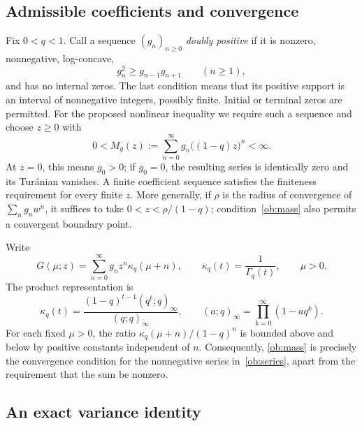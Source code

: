 \documentclass[11pt,a4paper]{article}
\theoremstyle{definition}
\theoremstyle{remark}
\begin{document}
\subsection{Admissible coefficients and convergence}
\label{ob:admissible}

Fix \(0<q<1\). Call a sequence
\((g_n)_{n\ge0}\) \emph{doubly positive} if it is nonzero,
nonnegative, log-concave,
\[
 g_n^2\ge g_{n-1}g_{n+1}\qquad(n\ge1),
\]
and has no internal zeros. The last condition means that its positive
support is an interval of nonnegative integers, possibly finite. Initial or terminal
zeros are permitted. For the proposed nonlinear inequality we require
such a sequence and choose \(z\ge0\) with
\begin{equation}\label{ob:mass}
 0<M_g(z):=\sum_{n=0}^{\infty}g_n\bigl((1-q)z\bigr)^n<\infty.
\end{equation}
At \(z=0\), this means \(g_0>0\); if \(g_0=0\), the resulting
series is identically zero and its Tur\'anian vanishes. A finite
coefficient sequence satisfies the finiteness requirement for every
finite \(z\). More generally, if \(\rho\) is the radius of
convergence of \(\sum_n g_n w^n\), it suffices to take
\(0<z<\rho/(1-q)\); condition~\eqref{ob:mass} also permits a
convergent boundary point.

Write
\begin{equation}\label{ob:series}
 G(\mu;z)=\sum_{n=0}^{\infty}g_nz^n\kappa_q(\mu+n),
 \qquad \kappa_q(t)=\frac1{\Gamma_q(t)},\qquad \mu>0.
\end{equation}
The product representation \cite[Section~5.18]{DLMF} is
\begin{equation}\label{ob:reciprocal-product}
 \kappa_q(t)=\frac{(1-q)^{t-1}(q^t;q)_\infty}{(q;q)_\infty},
 \qquad
 (a;q)_\infty=\prod_{k=0}^{\infty}(1-aq^k).
\end{equation}
For each fixed \(\mu>0\), the ratio
\(\kappa_q(\mu+n)/(1-q)^n\) is bounded above and below by
positive constants independent of \(n\). Consequently,
\eqref{ob:mass} is precisely the convergence condition for the
nonnegative series in~\eqref{ob:series}, apart from the requirement
that the sum be nonzero.

\subsection{An exact variance identity}
\label{ob:variance-subsection}
\end{document}
